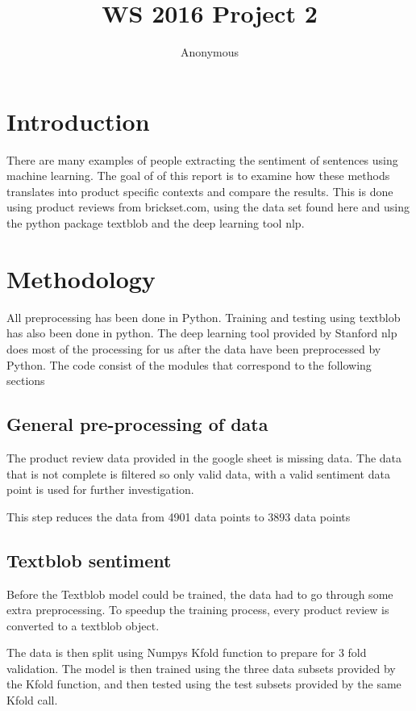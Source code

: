 \documentclass{sig-alternate}
\begin{document}
\title{WS 2016 Project 2}
\author{
\alignauthor 
Anonymous
}
\maketitle



\section{Introduction}
There are many examples of people extracting the sentiment of sentences using machine learning. The goal of of this report is to examine how these methods translates into product specific contexts and compare the results. This is done using product reviews from    brickset.com\cite{lego}, using the data set found here\cite{data} and using the python package textblob\cite{textblob} and the deep learning tool nlp\cite{nlp}. 

\section{Methodology}
All preprocessing has been done in Python\cite{python}. Training and testing using textblob has also been done in python. The deep learning tool provided by Stanford nlp does most of the processing for us after the data have been preprocessed by Python. The code consist of the modules that correspond to the following sections
\subsection{General pre-processing of data }
The product review data provided in the google sheet\cite{data} is missing data. The data that is not complete is filtered so only valid data, with a valid sentiment data point is used for further investigation.

This step reduces the data from 4901 data points to 3893 data points
\subsection{Textblob sentiment}
Before the Textblob model could be trained, the data had to go through some extra preprocessing. To speedup the training process, every product review is converted to a textblob object. 

The data is then split using Numpys\cite{numpy} Kfold function to prepare for 3 fold validation. The model is then trained using the three data subsets provided by the Kfold function, and then tested using the test subsets provided by the same Kfold call.
\end{document}

